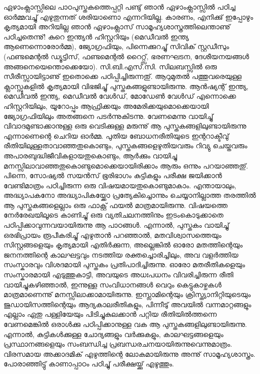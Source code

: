 ﻿
\vskip 2pt

ഏഴാംക്ലാസ്സിലെ പാഠപുസ്തകത്തെപ്പറ്റി പണ്ടു് ഞാന്‍ ഏഴാംക്ലാസ്സില്‍ പഠിച്ച ഓര്‍മ്മവച്ചു് എഴുതുന്നത് ശരിയാണൊ എന്നറിയില്ല. കാരണം,
എനിക്കു് ഇപ്പോഴും കൃത്യമായി അറിയില്ല ഞാന്‍ ഏഴാംക്ലാസ് സാമൂഹ്യശാസ്ത്രത്തിലെന്താണു് പഠിച്ചതെന്നു്! കുറെ ഇന്ത്യന്‍ ഹിസ്റ്ററിയും 
(മെഡീവല്‍ ഇന്ത്യ ആണെന്നൊരോര്‍മ്മ), ജ്യോഗ്രഫിയും, പിന്നെക്കുറച്ചു് സിവിക് സ്റ്റഡീസും (ഫണ്ടമെന്റല്‍ ഡ്യൂട്ടിസ്, ഫണ്ടമെന്റല്‍ റൈറ്റ്സ്, 
ഭരണഘടന, ദേശീയനയങ്ങള്‍ അങ്ങനെയെന്തൊക്കെയോ). സി.ബി.എസ്.സി. സിലബസ്സില്‍ ഒരു സീരീസ്സായിട്ടാണു് ഇതൊക്കെ പഠിപ്പിച്ചിരുന്നതു്. 
ആറുമുതല്‍ പത്തുവരെയുള്ള ക്ലാസ്സുകളില്‍ കൃത്യമായി വിഭജിച്ചു് പുസ്തകങ്ങളുണ്ടായിരുന്നു. ആന്‍ഷ്യന്റ് ഇന്ത്യ, മെഡീവല്‍ ഇന്ത്യ, മെഡീവല്‍ വേള്‍ഡ്, 
മോഡേണ്‍ വേള്‍ഡ് എന്നൊക്കെ ഹിസ്റ്ററിയിലും, യൂറോപ്പും ആഫ്രിക്കയും അമേരിക്കയുമൊക്കെയായി ജ്യോഗ്രഫിയിലും അതങ്ങനെ പടര്‍ന്നുകിടന്നു. 
വേണമെന്നു വായിച്ചു് വിവാദമുണ്ടാക്കാനുള്ള ഒരു വെടിക്കുള്ള മരുന്നു് ആ പുസ്തകങ്ങളിലുണ്ടായിരുന്നു എന്നാണെന്റെ ചെറിയ ഓര്‍മ്മ. പുതിയ ബോധനരീതിയുടെ ഇന്ററാക്ടീവു് രീതിയിലുള്ളതാവാഞ്ഞതുകൊണ്ടും, പുസ്തകങ്ങളെഴുതിയവരും റിവ്യു ചെയ്തവരും അപാരബുദ്ധിജീവികളായതുകൊണ്ടും, ആര്‍ക്കും വായിച്ചു മനസ്സിലാവാഞ്ഞതുകൊണ്ടുമൊക്കെയായിരിക്കാം ആരും ഒന്നും പറയാഞ്ഞതു്. പിന്നെ, സോഷ്യല്‍ സയന്‍സ് ഭൂരിഭാഗം കുട്ടികളും പരീക്ഷ ജയിക്കാന്‍ വേണ്ടിമാത്രം പഠിച്ചിരുന്ന ഒരു വിഷയമായതുകൊണ്ടുമാകാം. എന്തായാലും, അദ്ധ്യാപകനോ അദ്ധ്യാപികയ്ക്കോ പ്രത്യേകിച്ചൊന്നും ചെയ്യാനില്ലാത്ത തരത്തില്‍ 
ആ പുസ്തകങ്ങളെല്ലാം ഒരു ഫാക്റ്റ് ഫയല്‍ മാത്രമായിരുന്നു. വിഷയത്തെ നേര്‍രേഖയിലൂടെ കാണിച്ചു് ഒരു വ്യതിചലനത്തിനും ഇടംകൊടുക്കാതെ 
പഠിപ്പിക്കാവുന്നവയായിരുന്നു ആ പാഠങ്ങള്‍. എന്നാല്‍, പുസ്തകം വായിച്ചു് ഒരഭിപ്രായം രൂപീകരിച്ചു് എഴുതാന്‍ പറഞ്ഞാല്‍, മതവിശ്വാസത്തെയും സിസ്റ്റങ്ങളെയും കൃത്യമായി എതിര്‍ക്കുന്ന, അല്ലെങ്കില്‍ ഓരോ മതത്തിന്റെയും ജനനത്തിന്റെ കാലഘട്ടവും നടത്തിയ രക്തച്ചൊരിച്ചിലും, അവ വളര്‍ത്തിയ സംസ്കാരവും വിശദമായി പുസ്തകം പ്രതിപാദിച്ചിരുന്നു. ഓരോ മതരീതികളെയും സംസ്കാരമായി എടുത്തുകാട്ടി, അവയുടെ അധഃപധനം വിവരിച്ചിരുന്ന രീതി വായിച്ചുകഴിഞ്ഞാല്‍, ഇന്നുള്ള സംവിധാനങ്ങള്‍ വെറും കെട്ടുകാഴ്ചകള്‍ മാത്രമാണെന്നു് മനസ്സിലാക്കാമായിരുന്നു. ഇസ്ലാമിന്റെയും ക്രിസ്ത്യാനിറ്റിയുടെയും ജുഡായിസത്തിന്റെയും ആദ്യകാലരീതികളും, പിന്നീടു് അവയില്‍ വന്നമാറ്റങ്ങളും എല്ലാം ഏതു പള്ളിയേയും പിടിച്ചുകുലക്കാന്‍ പറ്റിയ രീതിയില്‍ത്തന്നെ വേണമെങ്കില്‍ ഒരാള്‍ക്കു പഠിപ്പിക്കാനുള്ള വക ആ പുസ്തകങ്ങളിലുണ്ടായിരുന്നു. എന്നാല്‍, കുട്ടികള്‍ക്കുള്ള ചോദ്യങ്ങളും വര്‍ക്കുകളും, കാലഘട്ടങ്ങളെയും പ്രസ്ഥാനങ്ങളെയും സംബന്ധിച്ച പ്രബന്ധരചനയായിരുന്നുവെന്നുമാത്രം. 
വിരസമായ അക്കാദമിക് എഴുത്തിന്റെ ലോകമായിരുന്നു അന്നു് സാമൂഹ്യശാസ്ത്രം. പോരാഞ്ഞിട്ടു് കാണാപ്പാഠം പഠിച്ചു് പരീക്ഷയ്ക്കു് എഴുത്തും.

